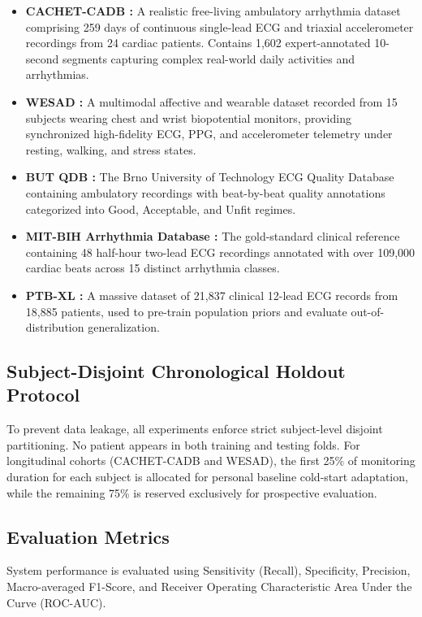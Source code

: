 \documentclass{ieeeaccess}
\begin{document}
\begin{itemize}
\item \textbf{CACHET-CADB \cite{ref:cachet}:} A realistic free-living ambulatory arrhythmia dataset comprising 259 days of continuous single-lead ECG and triaxial accelerometer recordings from 24 cardiac patients. Contains 1,602 expert-annotated 10-second segments capturing complex real-world daily activities and arrhythmias.
\item \textbf{WESAD \cite{ref:wesad}:} A multimodal affective and wearable dataset recorded from 15 subjects wearing chest and wrist biopotential monitors, providing synchronized high-fidelity ECG, PPG, and accelerometer telemetry under resting, walking, and stress states.
\item \textbf{BUT QDB \cite{ref:senecho}:} The Brno University of Technology ECG Quality Database containing ambulatory recordings with beat-by-beat quality annotations categorized into Good, Acceptable, and Unfit regimes.
\item \textbf{MIT-BIH Arrhythmia Database \cite{ref:annet}:} The gold-standard clinical reference containing 48 half-hour two-lead ECG recordings annotated with over 109,000 cardiac beats across 15 distinct arrhythmia classes.
\item \textbf{PTB-XL \cite{ref:ptbxl}:} A massive dataset of 21,837 clinical 12-lead ECG records from 18,885 patients, used to pre-train population priors and evaluate out-of-distribution generalization.
\end{itemize}

\subsection{Subject-Disjoint Chronological Holdout Protocol}
To prevent data leakage, all experiments enforce strict subject-level disjoint partitioning. No patient appears in both training and testing folds. For longitudinal cohorts (CACHET-CADB and WESAD), the first 25\% of monitoring duration for each subject is allocated for personal baseline cold-start adaptation, while the remaining 75\% is reserved exclusively for prospective evaluation.

\subsection{Evaluation Metrics}
System performance is evaluated using Sensitivity (Recall), Specificity, Precision, Macro-averaged F1-Score, and Receiver Operating Characteristic Area Under the Curve (ROC-AUC).
\end{document}
